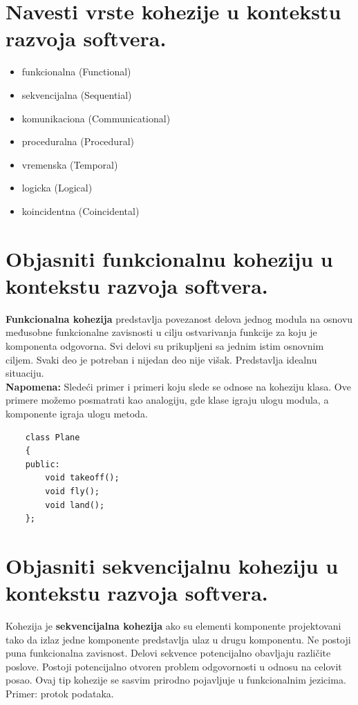 \documentclass[a4paper]{article}
\begin{document}
\section{Navesti vrste kohezije u kontekstu razvoja softvera.}
  \begin{itemize}
    \item funkcionalna (Functional)
    \item sekvencijalna (Sequential)
    \item komunikaciona (Communicational)
    \item proceduralna (Procedural)
    \item vremenska (Temporal)
    \item logicka (Logical)
    \item koincidentna (Coincidental)
  \end{itemize}
 
\section{Objasniti funkcionalnu koheziju u kontekstu razvoja softvera.}
  \textbf{Funkcionalna kohezija} predstavlja povezanost delova jednog modula na osnovu 
  međusobne funkcionalne zavisnosti u cilju ostvarivanja funkcije za koju je komponenta
  odgovorna. Svi delovi su prikupljeni sa jednim istim osnovnim ciljem. Svaki deo je potreban i
  nijedan deo nije višak. Predstavlja idealnu situaciju. \\
  \textbf{Napomena:} Sledeći primer i primeri koju slede se odnose na koheziju klasa. Ove primere
  možemo posmatrati kao analogiju, gde klase igraju ulogu modula, a komponente igraja ulogu
  metoda.

  \begin{lstlisting}
    class Plane
    {
    public:
        void takeoff();
        void fly();
        void land();
    };\end{lstlisting}

\section{Objasniti sekvencijalnu koheziju u kontekstu razvoja softvera.}
  Kohezija je \textbf{sekvencijalna kohezija} ako su elementi komponente projektovani 
  tako da izlaz jedne komponente predstavlja ulaz u drugu komponentu. Ne postoji puna
  funkcionalna zavisnost. Delovi sekvence potencijalno obavljaju različite poslove. Postoji
  potencijalno otvoren problem odgovornosti u odnosu na celovit posao. Ovaj tip kohezije
  se sasvim prirodno pojavljuje u funkcionalnim jezicima. Primer: protok podataka.
  
\end{document}
